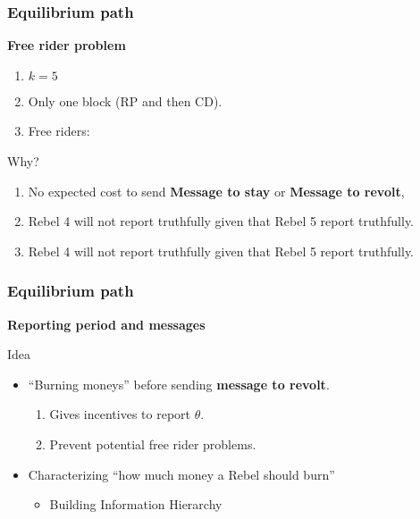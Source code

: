 \documentclass[10pt]{beamer}
\begin{document}
\begin{frame}
\frametitle{Equilibrium path}

\textbf{Free rider problem}


\begin{enumerate}
\item $k=5$
\item Only one block (RP and then CD).
\item Free riders:
\begin{center}
\end{center}

\end{enumerate}

Why?
\begin{enumerate}
\item {No expected cost} to send \textbf{Message to stay}  or \textbf{Message to revolt}, 
\item Rebel 4 will not report truthfully given that Rebel 5 report truthfully.
\item Rebel 4 will not report truthfully given that Rebel 5 report truthfully.
\end{enumerate}


\end{frame}

\begin{frame}
\frametitle{Equilibrium path}

\textbf{Reporting period and messages}

Idea

\begin{itemize}
\item ``{Burning moneys}'' before sending \textbf{message to revolt}.
\begin{enumerate}
\item Gives incentives to report $\theta$.
\item Prevent potential free rider problems.
\end{enumerate}
\item Characterizing ``how much money a Rebel should burn'' 
\begin{itemize}
\item Building Information Hierarchy
\end{itemize}

\end{itemize}

\end{frame}
\end{document}
